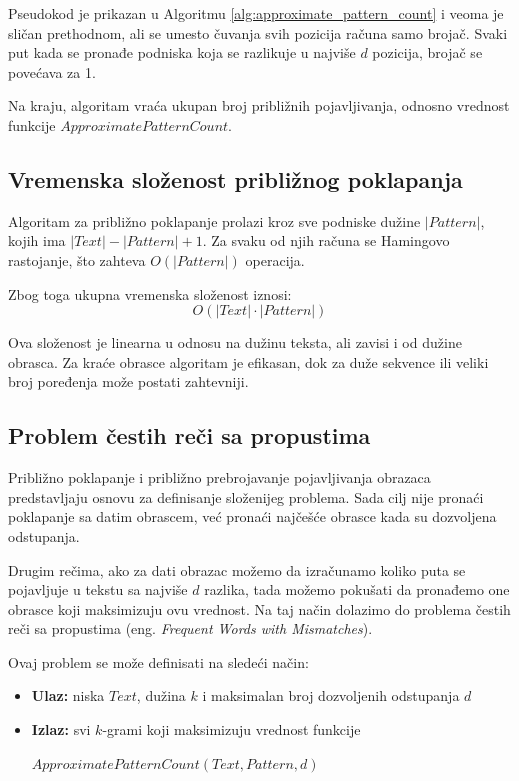 \documentclass[12pt,oneside]{memoir}
\begin{document}
Pseudokod je prikazan u Algoritmu \ref{alg:approximate_pattern_count} i veoma je sličan prethodnom, ali se umesto čuvanja svih pozicija računa samo brojač. Svaki put kada se pronađe podniska koja se razlikuje u najviše $d$ pozicija, brojač se povećava za 1.

Na kraju, algoritam vraća ukupan broj približnih pojavljivanja, odnosno vrednost funkcije $ApproximatePatternCount$.

\subsection{Vremenska složenost približnog poklapanja}

Algoritam za približno poklapanje prolazi kroz sve podniske dužine $|Pattern|$, kojih ima $|Text| - |Pattern| + 1$. Za svaku od njih računa se Hamingovo rastojanje, što zahteva $O(|Pattern|)$ operacija.

Zbog toga ukupna vremenska složenost iznosi:
\[
O(|Text| \cdot |Pattern|)
\]

Ova složenost je linearna u odnosu na dužinu teksta, ali zavisi i od dužine obrasca. Za kraće obrasce algoritam je efikasan, dok za duže sekvence ili veliki broj poređenja može postati zahtevniji.



\subsection{Problem čestih reči sa propustima}

Približno poklapanje i približno prebrojavanje pojavljivanja obrazaca predstavljaju osnovu za definisanje složenijeg problema. Sada cilj nije pronaći poklapanje sa datim obrascem, već pronaći najčešće obrasce kada su dozvoljena odstupanja.

Drugim rečima, ako za dati obrazac možemo da izračunamo koliko puta se pojavljuje u tekstu sa najviše $d$ razlika, tada možemo pokušati da pronađemo one obrasce koji maksimizuju ovu vrednost. Na taj način dolazimo do problema čestih reči sa propustima (eng. \textit{Frequent Words with Mismatches}).

Ovaj problem se može definisati na sledeći način:

\begin{itemize}
    \item \textbf{Ulaz:} niska $Text$, dužina $k$ i maksimalan broj dozvoljenih odstupanja $d$
    \item \textbf{Izlaz:} svi $k$-grami koji maksimizuju vrednost funkcije
    
    $ApproximatePatternCount(Text, Pattern, d)$
\end{itemize}
\end{document}
